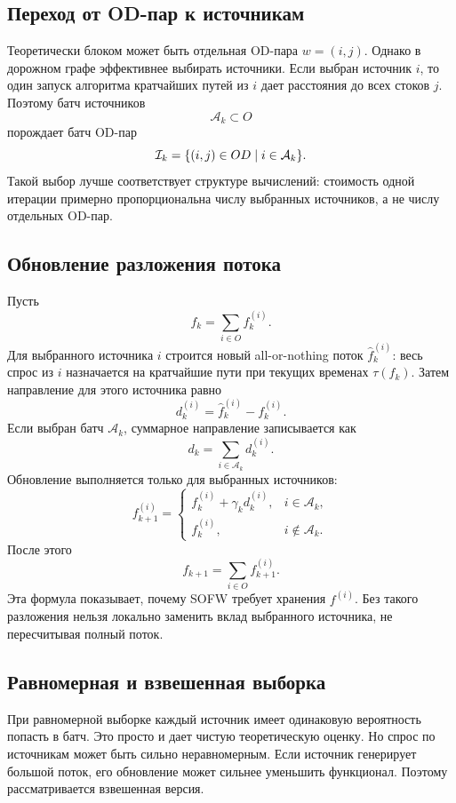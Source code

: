 \subsection{Переход от OD-пар к источникам}

Теоретически блоком может быть отдельная OD-пара $w=(i,j)$.
Однако в дорожном графе эффективнее выбирать источники.
Если выбран источник $i$, то один запуск алгоритма кратчайших путей из $i$ дает расстояния
до всех стоков $j$.
Поэтому батч источников
\[
    \mathcal A_k\subset O
\]
порождает батч OD-пар
\[
    \mathcal{I}_k=\{(i,j)\in OD\mid i\in\mathcal A_k\}.
\]
Такой выбор лучше соответствует структуре вычислений:
стоимость одной итерации примерно пропорциональна числу выбранных источников, а не числу
отдельных OD-пар.

\subsection{Обновление разложения потока}

Пусть
\[
    f_k=\sum_{i\in O}f_k^{(i)}.
\]
Для выбранного источника $i$ строится новый all-or-nothing поток $\hat f_k^{(i)}$:
весь спрос из $i$ назначается на кратчайшие пути при текущих временах $\tau(f_k)$.
Затем направление для этого источника равно
\[
    d_k^{(i)}=\hat f_k^{(i)}-f_k^{(i)}.
\]
Если выбран батч $\mathcal A_k$, суммарное направление записывается как
\[
    d_k=\sum_{i\in\mathcal A_k}d_k^{(i)}.
\]
Обновление выполняется только для выбранных источников:
\[
    f_{k+1}^{(i)}
    =
    \begin{cases}
        f_k^{(i)}+\gamma_k d_k^{(i)}, & i\in\mathcal A_k,\\
        f_k^{(i)}, & i\notin\mathcal A_k.
    \end{cases}
\]
После этого
\[
    f_{k+1}=\sum_{i\in O}f_{k+1}^{(i)}.
\]
Эта формула показывает, почему SOFW требует хранения $f^{(i)}$.
Без такого разложения нельзя локально заменить вклад выбранного источника, не пересчитывая
полный поток.

\subsection{Равномерная и взвешенная выборка}

При равномерной выборке каждый источник имеет одинаковую вероятность попасть в батч.
Это просто и дает чистую теоретическую оценку.
Но спрос по источникам может быть сильно неравномерным.
Если источник генерирует большой поток, его обновление может сильнее уменьшить функционал.
Поэтому рассматривается взвешенная версия.

